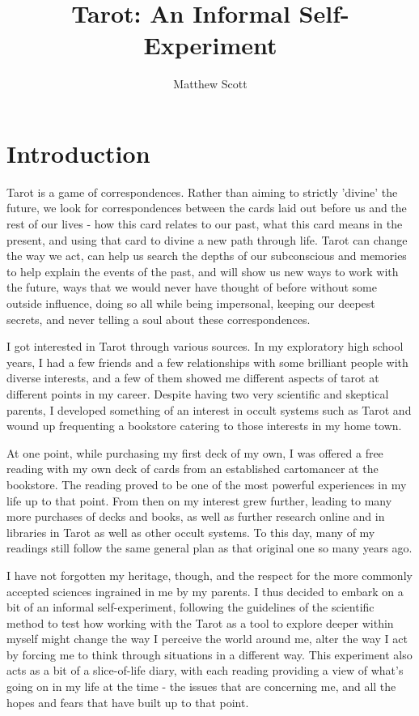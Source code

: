 \documentclass{article}
\begin{document}
\title{Tarot: An Informal Self-Experiment}
\author{Matthew Scott}
\maketitle

\section{Introduction}
Tarot is a game of correspondences.  Rather than aiming to strictly
'divine' the future, we look for correspondences between the cards laid
out before us and the rest of our lives - how this card relates to our
past, what this card means in the present, and using that card to divine
a new path through life.  Tarot can change the way we act, can help us
search the depths of our subconscious and memories to help explain the
events of the past, and will show us new ways to work with the future,
ways that we would never have thought of before without some outside
influence, doing so all while being impersonal, keeping our deepest
secrets, and never telling a soul about these correspondences.

I got interested in Tarot through various sources.  In my exploratory
high school years, I had a few friends and a few relationships with some
brilliant people with diverse interests, and a few of them showed me
different aspects of tarot at different points in my career.  Despite
having two very scientific and skeptical parents, I developed something
of an interest in occult systems such as Tarot and wound up frequenting
a bookstore catering to those interests in my home town.  

At one point, while purchasing my first deck of my own, I was offered a
free reading with my own deck of cards from an established cartomancer
at the bookstore.  The reading proved to be one of the most powerful
experiences in my life up to that point.  From then on my interest grew
further, leading to many more purchases of decks and books, as well as
further research online and in libraries in Tarot as well as other
occult systems.  To this day, many of my readings still follow the same
general plan as that original one so many years ago.

I have not forgotten my heritage, though, and the respect for the more
commonly accepted sciences ingrained in me by my parents.  I thus
decided to embark on a bit of an informal self-experiment, following the
guidelines of the scientific method to test how working with the Tarot
as a tool to explore deeper within myself might change the way I
perceive the world around me, alter the way I act by forcing me to think
through situations in a different way.  This experiment also acts as a
bit of a slice-of-life diary, with each reading providing a view of
what's going on in my life at the time - the issues that are concerning
me, and all the hopes and fears that have built up to that point.
\end{document}
